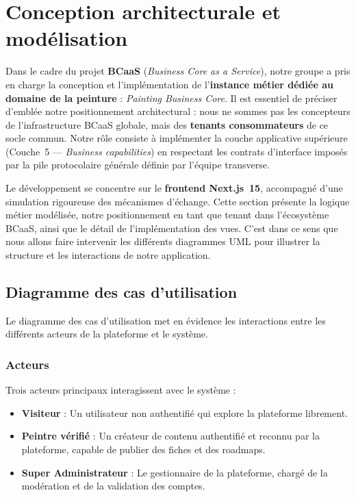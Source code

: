 \documentclass[12pt,a4paper]{report}
\begin{document}
\newpage
\section{Conception architecturale et modélisation }

Dans le cadre du projet \textbf{BCaaS} (\textit{Business Core as a Service}), notre groupe a pris en charge la conception et l'implémentation de l'\textbf{instance métier dédiée au domaine de la peinture} : \textit{Painting Business Core}. Il est essentiel de préciser d'emblée notre positionnement architectural : nous ne sommes pas les concepteurs de l'infrastructure BCaaS globale, mais des \textbf{tenants consommateurs} de ce socle commun. Notre rôle consiste à implémenter la couche applicative supérieure (Couche~5 --- \textit{Business capabilities}) en respectant les contrats d'interface imposés par la pile protocolaire générale définie par l'équipe transverse.

Le développement se concentre sur le \textbf{frontend Next.js~15}, accompagné d'une simulation rigoureuse des mécanismes d'échange. Cette section présente la logique métier modélisée, notre positionnement en tant que tenant dans l'écosystème BCaaS, ainsi que le détail de l'implémentation des vues. C'est dans ce sens que nous allons faire intervenir les différents diagrammes UML pour illustrer la structure et les interactions de notre application.

\subsection{Diagramme des cas d'utilisation}

Le diagramme des cas d'utilisation met en évidence les interactions entre les différents acteurs de la plateforme et le système.

\subsubsection*{Acteurs}

Trois acteurs principaux interagissent avec le système :
\begin{itemize}
    \item \textbf{Visiteur} : Un utilisateur non authentifié qui explore la plateforme librement.
    \item \textbf{Peintre vérifié} : Un créateur de contenu authentifié et reconnu par la plateforme, capable de publier des fiches et des roadmaps.
    \item \textbf{Super Administrateur} : Le gestionnaire de la plateforme, chargé de la modération et de la validation des comptes.
\end{itemize}
\end{document}
